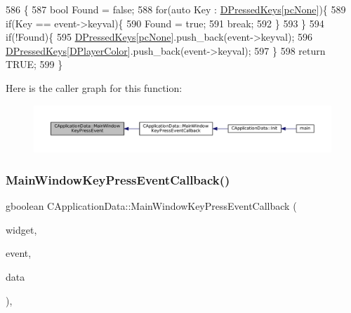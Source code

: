 \begin{DoxyCode}
586                                                                                        \{
587     \textcolor{keywordtype}{bool} Found = \textcolor{keyword}{false};
588     \textcolor{keywordflow}{for}(\textcolor{keyword}{auto} Key : \hyperlink{classCApplicationData_ac6f50c764f7561c0bd2a9fbce55b2701}{DPressedKeys}[\hyperlink{GameDataTypes_8h_aafb0ca75933357ff28a6d7efbdd7602fa88767aa8e02c7b3192bbab4127b3d729}{pcNone}])\{
589         \textcolor{keywordflow}{if}(Key == event->keyval)\{
590             Found = \textcolor{keyword}{true};
591             \textcolor{keywordflow}{break};
592         \}
593     \}
594     \textcolor{keywordflow}{if}(!Found)\{
595         \hyperlink{classCApplicationData_ac6f50c764f7561c0bd2a9fbce55b2701}{DPressedKeys}[\hyperlink{GameDataTypes_8h_aafb0ca75933357ff28a6d7efbdd7602fa88767aa8e02c7b3192bbab4127b3d729}{pcNone}].push\_back(event->keyval);
596         \hyperlink{classCApplicationData_ac6f50c764f7561c0bd2a9fbce55b2701}{DPressedKeys}[\hyperlink{classCApplicationData_a53550939b20cba70570f113e4d1c5d02}{DPlayerColor}].push\_back(event->keyval);
597     \}
598     \textcolor{keywordflow}{return} TRUE;
599 \}
\end{DoxyCode}
Here is the caller graph for this function\+:\nopagebreak
\begin{figure}[H]
\begin{center}
\leavevmode
\includegraphics[width=350pt]{classCApplicationData_a9b451765c93ecf00322f5450d29bfffe_icgraph}
\end{center}
\end{figure}
\hypertarget{classCApplicationData_aca6cce5b1cd5142984d2880294ff6ed4}{}\label{classCApplicationData_aca6cce5b1cd5142984d2880294ff6ed4} 
\subsubsection{\texorpdfstring{Main\+Window\+Key\+Press\+Event\+Callback()}{MainWindowKeyPressEventCallback()}}
{\footnotesize\ttfamily gboolean C\+Application\+Data\+::\+Main\+Window\+Key\+Press\+Event\+Callback (\begin{DoxyParamCaption}\item[{Gtk\+Widget $\ast$}]{widget,  }\item[{Gdk\+Event\+Key $\ast$}]{event,  }\item[{gpointer}]{data }\end{DoxyParamCaption})\hspace{0.3cm}{\ttfamily [static]}, {\ttfamily [protected]}}



